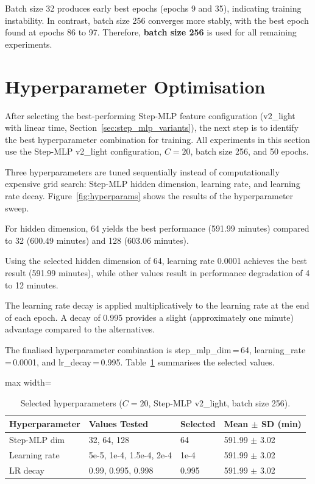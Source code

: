 Batch size 32 produces early best epochs (epochs 9 and 35), indicating training instability.
In contrast, batch size 256 converges more stably, with the best epoch found at epochs 86
to 97. Therefore, \textbf{batch size 256} is used for all remaining experiments.

\section{Hyperparameter Optimisation}
\label{sec:hyperparam_opt}

After selecting the best-performing Step-MLP feature configuration (v2\_light with linear
time, Section~\ref{sec:step_mlp_variants}), the next step is to identify the best
hyperparameter combination for training. All experiments in this section use the Step-MLP
v2\_light configuration, $C = 20$, batch size 256, and 50 epochs.

Three hyperparameters are tuned sequentially instead of computationally expensive grid
search: Step-MLP hidden dimension, learning rate, and learning rate decay.
Figure~\ref{fig:hyperparams} shows the results of the hyperparameter sweep.

For hidden dimension, 64 yields the best performance (591.99 minutes) compared to 32
(600.49 minutes) and 128 (603.06 minutes).

Using the selected hidden dimension of 64, learning rate 0.0001 achieves the best result
(591.99 minutes), while other values result in performance degradation of 4 to 12 minutes.

The learning rate decay is applied multiplicatively to the learning rate at the end of each
epoch. A decay of 0.995 provides a slight (approximately one minute) advantage compared to
the alternatives.

The finalised hyperparameter combination is step\_mlp\_dim\,=\,64, learning\_rate\,=\,0.0001,
and lr\_decay\,=\,0.995. Table~\ref{tab:hyperparam_results} summarises the selected values.

\begin{table}[H]
\centering
\caption{Selected hyperparameters ($C = 20$, Step-MLP v2\_light, batch size 256).}
\label{tab:hyperparam_results}
\begin{adjustbox}{max width=\textwidth}
\begin{tabular}{llll}
\toprule
\textbf{Hyperparameter} & \textbf{Values Tested} & \textbf{Selected}
    & \textbf{Mean $\pm$ SD (min)} \\
\midrule
Step-MLP dim  & 32, 64, 128               & 64    & 591.99 $\pm$ 3.02 \\
Learning rate & 5e-5, 1e-4, 1.5e-4, 2e-4 & 1e-4  & 591.99 $\pm$ 3.02 \\
LR decay      & 0.99, 0.995, 0.998        & 0.995 & 591.99 $\pm$ 3.02 \\
\bottomrule
\end{tabular}
\end{adjustbox}
\end{table}

